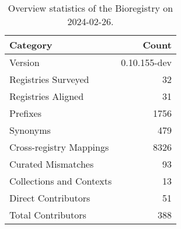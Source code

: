 \begin{table}
\caption{Overview statistics of the Bioregistry on 2024-02-26.}
\label{tab:bioregistry-summary}
\begin{tabular}{lr}
\toprule
Category & Count \\
\midrule
Version & 0.10.155-dev \\
Registries Surveyed & 32 \\
Registries Aligned & 31 \\
Prefixes & 1756 \\
Synonyms & 479 \\
Cross-registry Mappings & 8326 \\
Curated Mismatches & 93 \\
Collections and Contexts & 13 \\
Direct Contributors & 51 \\
Total Contributors & 388 \\
\bottomrule
\end{tabular}
\end{table}

